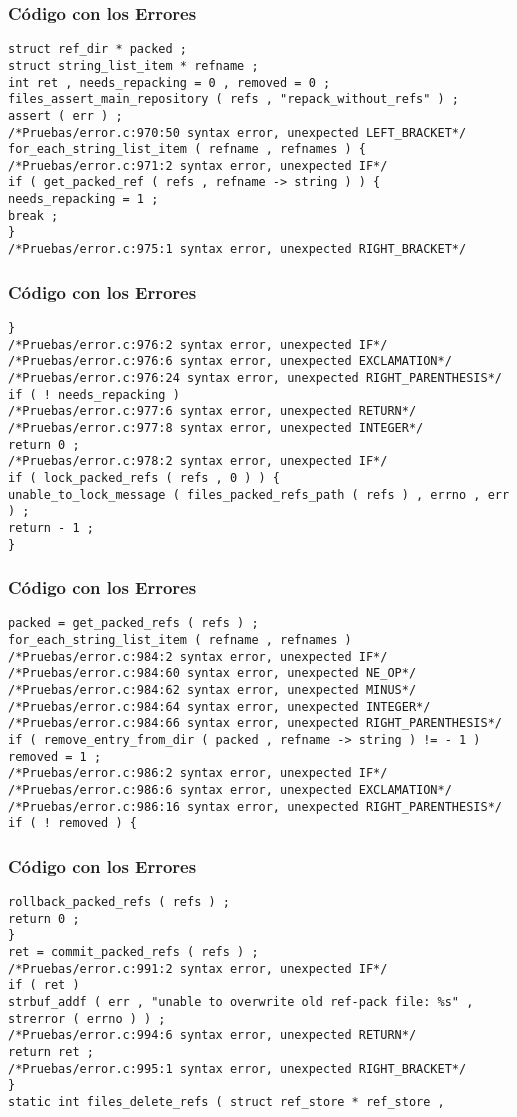 \documentclass{beamer}
\begin{document}
\begin{frame}[fragile]
\frametitle{C\'odigo con los Errores}
\begin{verbatim}
struct ref_dir * packed ; 
struct string_list_item * refname ; 
int ret , needs_repacking = 0 , removed = 0 ; 
files_assert_main_repository ( refs , "repack_without_refs" ) ; 
assert ( err ) ; 
/*Pruebas/error.c:970:50 syntax error, unexpected LEFT_BRACKET*/
for_each_string_list_item ( refname , refnames ) { 
/*Pruebas/error.c:971:2 syntax error, unexpected IF*/
if ( get_packed_ref ( refs , refname -> string ) ) { 
needs_repacking = 1 ; 
break ; 
} 
/*Pruebas/error.c:975:1 syntax error, unexpected RIGHT_BRACKET*/
\end{verbatim}
\end{frame}
\begin{frame}[fragile]
\frametitle{C\'odigo con los Errores}
\begin{verbatim}
} 
/*Pruebas/error.c:976:2 syntax error, unexpected IF*/
/*Pruebas/error.c:976:6 syntax error, unexpected EXCLAMATION*/
/*Pruebas/error.c:976:24 syntax error, unexpected RIGHT_PARENTHESIS*/
if ( ! needs_repacking ) 
/*Pruebas/error.c:977:6 syntax error, unexpected RETURN*/
/*Pruebas/error.c:977:8 syntax error, unexpected INTEGER*/
return 0 ; 
/*Pruebas/error.c:978:2 syntax error, unexpected IF*/
if ( lock_packed_refs ( refs , 0 ) ) { 
unable_to_lock_message ( files_packed_refs_path ( refs ) , errno , err ) ; 
return - 1 ; 
} 
\end{verbatim}
\end{frame}
\begin{frame}[fragile]
\frametitle{C\'odigo con los Errores}
\begin{verbatim}
packed = get_packed_refs ( refs ) ; 
for_each_string_list_item ( refname , refnames ) 
/*Pruebas/error.c:984:2 syntax error, unexpected IF*/
/*Pruebas/error.c:984:60 syntax error, unexpected NE_OP*/
/*Pruebas/error.c:984:62 syntax error, unexpected MINUS*/
/*Pruebas/error.c:984:64 syntax error, unexpected INTEGER*/
/*Pruebas/error.c:984:66 syntax error, unexpected RIGHT_PARENTHESIS*/
if ( remove_entry_from_dir ( packed , refname -> string ) != - 1 ) 
removed = 1 ; 
/*Pruebas/error.c:986:2 syntax error, unexpected IF*/
/*Pruebas/error.c:986:6 syntax error, unexpected EXCLAMATION*/
/*Pruebas/error.c:986:16 syntax error, unexpected RIGHT_PARENTHESIS*/
if ( ! removed ) { 
\end{verbatim}
\end{frame}
\begin{frame}[fragile]
\frametitle{C\'odigo con los Errores}
\begin{verbatim}
rollback_packed_refs ( refs ) ; 
return 0 ; 
} 
ret = commit_packed_refs ( refs ) ; 
/*Pruebas/error.c:991:2 syntax error, unexpected IF*/
if ( ret ) 
strbuf_addf ( err , "unable to overwrite old ref-pack file: %s" , 
strerror ( errno ) ) ; 
/*Pruebas/error.c:994:6 syntax error, unexpected RETURN*/
return ret ; 
/*Pruebas/error.c:995:1 syntax error, unexpected RIGHT_BRACKET*/
} 
static int files_delete_refs ( struct ref_store * ref_store , 
\end{verbatim}
\end{frame}
\end{document}
